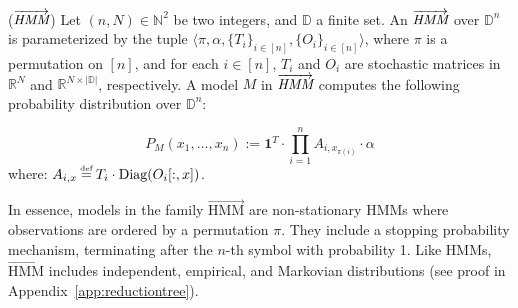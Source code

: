 \begin{definition} {($\overrightarrow{\emph{HMM}}$)}\label{def:hmmnonsequentialdata}
Let $(n,N) \in \mathbb{N}^{2}$ be two integers, and $\mathbb{D}$ a finite set. An $\overrightarrow{\emph{HMM}}$ over $\mathbb{D}^{n}$ is parameterized by the tuple $\langle\pi, \alpha, \{T_{i}\}_{i \in [n]}, \{O_{i}\}_{i \in [n]}\rangle$, where $\pi$ is a permutation on $[n]$, and for each $i \in [n]$, $T_{i}$ and $O_{i}$ are stochastic matrices in $\mathbb{R}^{N}$ and $\mathbb{R}^{N \times |\mathbb{D}|}$, respectively. A model $M$ in $\overrightarrow{\emph{HMM}}$ computes the following probability distribution over $\mathbb{D}^{n}$:

$$
      P_{M}(x_{1}, \ldots, x_{n}) := \mathbf{1}^{T} \cdot \prod\limits_{i=1}^{n} A_{i,x_{\pi(i)}} \cdot \alpha
      $$
  where: 
  $A_{i,x} \myeq T_{i} \cdot \text{Diag}(O_{i}[:,x])$.
\end{definition}

In essence, models in the family $\overrightarrow{\text{HMM}}$ are non-stationary HMMs where observations are ordered by a permutation $\pi$. They include a stopping probability mechanism, terminating after the $n$-th symbol with probability 1. Like HMMs, $\overrightarrow{\text{HMM}}$ includes independent, empirical, and Markovian distributions (see proof in  Appendix~\ref{app:reductiontree}).


